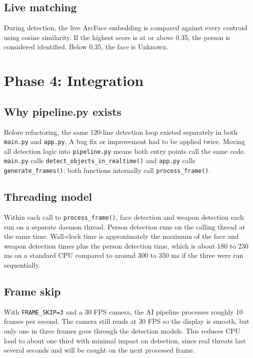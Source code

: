 \documentclass[12pt,a4paper]{report}
\begin{document}
\subsection{Live matching}

During detection, the live ArcFace embedding is compared against every centroid using cosine similarity. If the highest score is at or above 0.35, the person is considered identified. Below 0.35, the face is Unknown.

\section{Phase 4: Integration}

\subsection{Why pipeline.py exists}

Before refactoring, the same 120-line detection loop existed separately in both \texttt{main.py} and \texttt{app.py}. A bug fix or improvement had to be applied twice. Moving all detection logic into \texttt{pipeline.py} means both entry points call the same code. \texttt{main.py} calls \texttt{detect\_objects\_in\_realtime()} and \texttt{app.py} calls \texttt{generate\_frames()}; both functions internally call \texttt{process\_frame()}.

\subsection{Threading model}

Within each call to \texttt{process\_frame()}, face detection and weapon detection each run on a separate daemon thread. Person detection runs on the calling thread at the same time. Wall-clock time is approximately the maximum of the face and weapon detection times plus the person detection time, which is about 180 to 230 ms on a standard CPU compared to around 300 to 350 ms if the three were run sequentially.

\subsection{Frame skip}

With \texttt{FRAME\_SKIP=3} and a 30 FPS camera, the AI pipeline processes roughly 10 frames per second. The camera still reads at 30 FPS so the display is smooth, but only one in three frames goes through the detection models. This reduces CPU load to about one third with minimal impact on detection, since real threats last several seconds and will be caught on the next processed frame.
\end{document}
